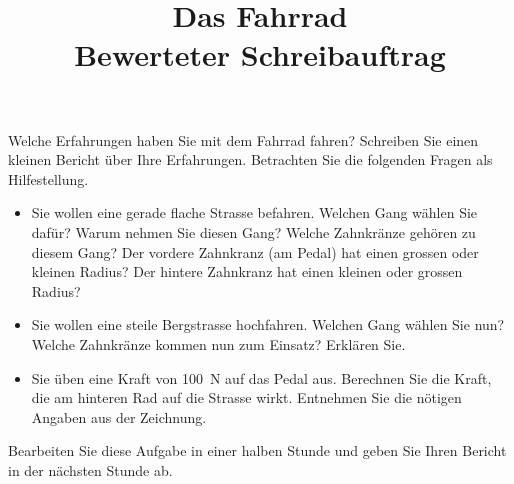 \documentclass[12pt,a5paper,twoside]{article}
\title{Das Fahrrad\\Bewerteter Schreibauftrag}
\date{}
\begin{document}
\maketitle


\begin{aufgabe}
	Welche Erfahrungen haben Sie mit dem Fahrrad fahren? Schreiben Sie einen kleinen Bericht über Ihre Erfahrungen.
	Betrachten Sie die folgenden Fragen als Hilfestellung.
	\begin{itemize}
		\item	Sie wollen eine gerade flache Strasse befahren. Welchen Gang wählen Sie dafür? Warum nehmen Sie diesen Gang?
		Welche Zahnkränze gehören zu diesem Gang? Der vordere Zahnkranz (am Pedal) hat einen grossen oder kleinen Radius?
		Der hintere Zahnkranz hat einen kleinen oder grossen Radius?

		\item Sie wollen eine steile Bergstrasse hochfahren. Welchen Gang wählen Sie nun? Welche Zahnkränze kommen nun zum Einsatz?
			Erklären Sie.

		\item Sie üben eine Kraft von \SI{100}{N} auf das Pedal aus.
			Berechnen Sie die Kraft, die am hinteren Rad auf die Strasse wirkt. Entnehmen Sie die nötigen Angaben aus der Zeichnung.
	
	\end{itemize}


	\begin{center}
	\end{center}

\end{aufgabe}

Bearbeiten Sie diese Aufgabe in einer halben Stunde und geben Sie Ihren Bericht in der nächsten Stunde ab.

%
%
%
%
%
%
%
%
%
\end{document}
